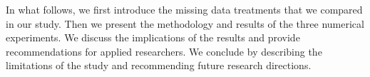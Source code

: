 In what follows, we first introduce the missing data treatments that we compared in our study.
Then we present the methodology and results of the three numerical experiments.
We discuss the implications of the results and provide recommendations for applied researchers.
We conclude by describing the limitations of the study and recommending future research directions.
